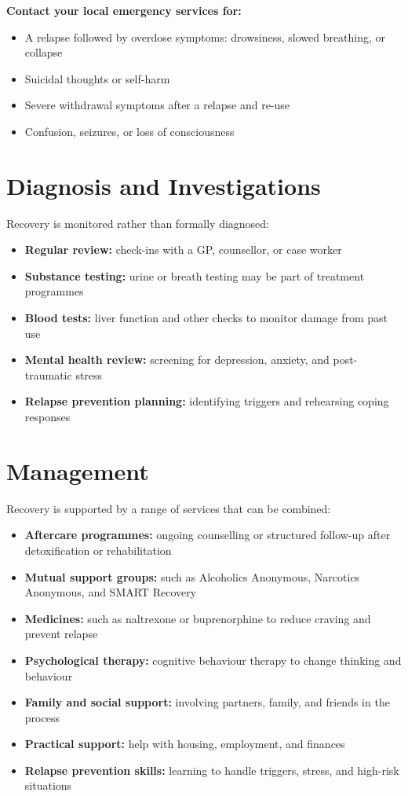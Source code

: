 \textbf{Contact your local emergency services for:}
\begin{itemize}
    \item A relapse followed by overdose symptoms: drowsiness, slowed breathing, or collapse
    \item Suicidal thoughts or self-harm
    \item Severe withdrawal symptoms after a relapse and re-use
    \item Confusion, seizures, or loss of consciousness
\end{itemize}

\section*{Diagnosis and Investigations}
Recovery is monitored rather than formally diagnosed:

\begin{itemize}
    \item \textbf{Regular review:} check-ins with a GP, counsellor, or case worker
    \item \textbf{Substance testing:} urine or breath testing may be part of treatment programmes
    \item \textbf{Blood tests:} liver function and other checks to monitor damage from past use
    \item \textbf{Mental health review:} screening for depression, anxiety, and post-traumatic stress
    \item \textbf{Relapse prevention planning:} identifying triggers and rehearsing coping responses
\end{itemize}

\section*{Management}
Recovery is supported by a range of services that can be combined:

\begin{itemize}
    \item \textbf{Aftercare programmes:} ongoing counselling or structured follow-up after detoxification or rehabilitation
    \item \textbf{Mutual support groups:} such as Alcoholics Anonymous, Narcotics Anonymous, and SMART Recovery
    \item \textbf{Medicines:} such as naltrexone or buprenorphine to reduce craving and prevent relapse
    \item \textbf{Psychological therapy:} cognitive behaviour therapy to change thinking and behaviour
    \item \textbf{Family and social support:} involving partners, family, and friends in the process
    \item \textbf{Practical support:} help with housing, employment, and finances
    \item \textbf{Relapse prevention skills:} learning to handle triggers, stress, and high-risk situations
\end{itemize}

